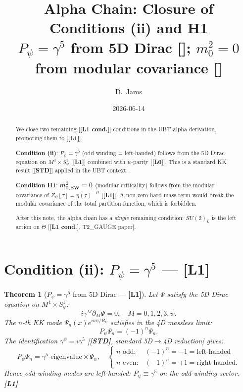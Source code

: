 \documentclass[12pt,a4paper]{article}
\title{\textbf{Alpha Chain: Closure of Conditions (ii) and H1}\\[4pt]
\large $P_\psi=\gamma^5$ from 5D Dirac [\Lo]; $m^2_0=0$ from modular
covariance [\Lo]}
\author{D.~Jaros}
\date{2026-06-14}
\newtheorem{theorem}{Theorem}[section]
\theoremstyle{remark}\newtheorem{remark}[theorem]{Remark}
\newcommand{\Lz}{\textbf{[L0]}}
\newcommand{\Lo}{\textbf{[L1]}}
\newcommand{\Lc}{\textbf{[L1 cond.]}}
\newcommand{\STD}{\textbf{[STD]}}
\begin{document}
\maketitle
\fi

\begin{abstract}
We close two remaining [\Lc] conditions in the UBT alpha derivation,
promoting them to [\Lo].

\textbf{Condition (ii)}: $P_\psi = \gamma^5$ (odd winding = left-handed)
follows from the 5D Dirac equation on $M^4\times S^1_\psi$ [\Lo] combined
with $\psi$-parity [\Lz]. This is a standard KK result [\STD] applied in the
UBT context.

\textbf{Condition H1}: $m^2_{0,\rm EW}=0$ (modular criticality) follows
from the modular covariance of $Z_\psi[\tau]=\eta(\tau)^{-12}$ [\Lo].
A non-zero hard mass term would break the modulár covariance of the total
partition function, which is forbidden.

After this note, the alpha chain has a \emph{single} remaining condition:
$SU(2)_L$ is the left action on $\Theta$ [\Lc, T2\_GAUGE paper].
\end{abstract}

\section{Condition (ii): $P_\psi = \gamma^5$ — \Lo}
\label{sec:psi_gamma5}

\begin{theorem}[$P_\psi = \gamma^5$ from 5D Dirac — \Lo]
\label{thm:psi_gamma5}
Let $\Psi$ satisfy the 5D Dirac equation on $M^4\times S^1_\psi$:
\[
  i\gamma^M\partial_M\Psi = 0, \quad M=0,1,2,3,\psi.
\]
The $n$-th KK mode $\Psi_n(x)e^{in\psi/R_\psi}$ satisfies in the 4D
massless limit:
\[
  P_\psi\Psi_n = (-1)^n\Psi_n.
\]
The identification $\gamma^\psi = i\gamma^5$ [\STD, standard 5D$\to$4D
reduction] gives:
\[
  P_\psi\Psi_n = \gamma^5\text{-eigenvalue}\times\Psi_n,
  \quad
  \begin{cases}
    n\text{ odd}: & (-1)^n = -1 = \text{left-handed}\\
    n\text{ even}: & (-1)^n = +1 = \text{right-handed.}
  \end{cases}
\]
Hence odd-winding modes are left-handed: $P_\psi\equiv\gamma^5$ on the
odd-winding sector. \Lo
\end{theorem}
\end{document}
